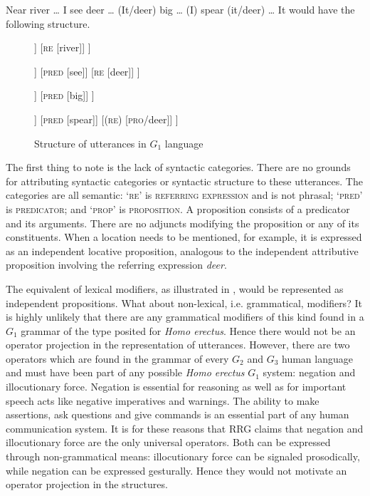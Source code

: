 \documentclass[output=paper,colorlinks,citecolor=brown]{langscibook}
\begin{document}
\ea \label{vanvalin_example_3}Near river \ldots{}  I see deer \ldots{}  (It/deer) big \ldots{}  (I) spear (it/deer) \ldots\z
It would have the following structure.

\begin{figure}
\small%
  \begin{forest}
		[\textsc{prop}
		  [\textsc{pred} [near]]
		  [\textsc{re} [river]]
		]
 \end{forest}\hfill%
 \begin{forest}
		[\textsc{prop},calign=child, calign child=2
		  [\textsc{re} [\textsc{Spkr}]]
		  [\textsc{pred} [see]]
		  [\textsc{re} [deer]]
		]
 \end{forest}\hfill%
 \begin{forest}
		[\textsc{prop}
		  [\textsc{(re)} [\textsc{pro}/deer]]
		  [\textsc{pred} [big]]
		]
 \end{forest}\hfill%
 \begin{forest}
		[\textsc{prop},calign=child, calign child=2
		  [\textsc{(re)} [\textsc{Spkr}]]
		  [\textsc{pred} [spear]]
		  [\textsc{(re)} [\textsc{pro}/deer]]
		]
 \end{forest}%
\caption{\label{fig:fig2}Structure of utterances in $G_1$ language}
\end{figure}

The first thing to note is the lack of syntactic categories.  There are no grounds for attributing syntactic categories or syntactic structure to these utterances.  The categories are all semantic: ‘\textsc{re}’ is \textsc{referring expression} and is not phrasal; ‘\textsc{pred}’ is \textsc{predicator}; and ‘\textsc{prop}’ is \textsc{proposition}.  A proposition consists of a predicator and its arguments. There are no adjuncts modifying the proposition or any of its constituents.  When a location needs to be mentioned, for example, it is expressed as an independent locative proposition, analogous to the independent attributive proposition involving the referring expression \emph{deer}.  

The equivalent of lexical modifiers, as illustrated in , would be represented as independent propositions.  What about non-lexical, i.e. grammatical, modifiers?  It is highly unlikely that there are any grammatical modifiers of this kind found in a $G_1$ grammar of the type posited for \emph{Homo erectus}.  Hence there would not be an operator projection in the representation of utterances.  However, there are two operators which are found in the grammar of every $G_2$ and $G_3$ human language and must have been part of any possible \emph{Homo erectus} $G_1$ system: negation and illocutionary force. Negation is essential for reasoning as well as for important speech acts like negative imperatives and warnings.  The ability to make assertions, ask questions and give commands is an essential part of any human communication system.  It is for these reasons that RRG claims that negation and illocutionary force are the only universal operators.  Both can be expressed through non-grammatical means: illocutionary force can be signaled prosodically, while negation can be expressed gesturally.  Hence they would not motivate an operator projection in the structures.
\end{document}
